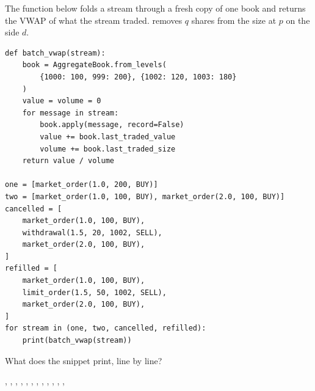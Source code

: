 \begin{question}
\label{question.vwapOfTwoBuysAgainstOne}
The function below folds a stream through a fresh copy of one book
and returns the VWAP of what the stream traded.
 removes $q$ shares from the size at $p$ on the side $d$.
\begin{lstlisting}[caption={Four streams, one book}, label=listing.vwapOfTwoBuysAgainstOne]
def batch_vwap(stream):
    book = AggregateBook.from_levels(
        {1000: 100, 999: 200}, {1002: 120, 1003: 180}
    )
    value = volume = 0
    for message in stream:
        book.apply(message, record=False)
        value += book.last_traded_value
        volume += book.last_traded_size
    return value / volume

one = [market_order(1.0, 200, BUY)]
two = [market_order(1.0, 100, BUY), market_order(2.0, 100, BUY)]
cancelled = [
    market_order(1.0, 100, BUY),
    withdrawal(1.5, 20, 1002, SELL),
    market_order(2.0, 100, BUY),
]
refilled = [
    market_order(1.0, 100, BUY),
    limit_order(1.5, 50, 1002, SELL),
    market_order(2.0, 100, BUY),
]
for stream in (one, two, cancelled, refilled):
    print(batch_vwap(stream))
\end{lstlisting}
What does the snippet print, line by line?
\begin{choices}
 \choice {}, , , 
 \correctchoice {}, , , 
 \choice {}, , , 
 \choice {}, , , 
\end{choices}
\end{question}

